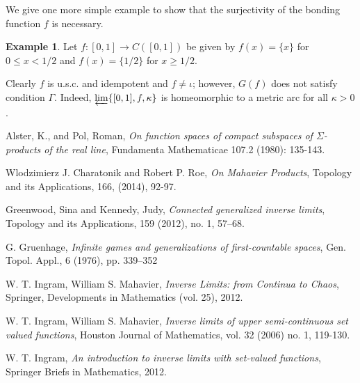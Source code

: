 \documentclass{amsart}
\theoremstyle{definition}
\newtheorem{example}[theorem]{Example}
\begin{document}
We give one more simple example to show that the surjectivity of the bonding function $f$ is necessary.

\begin{example} \label{ex2} Let $f: [0,1] \rightarrow C([0,1])$ be given by $f(x) = \{x\}$ for $0 \le x < 1/2$ and $f(x) = \{1/2\}$ for $x \ge 1/2$.
\end{example}

Clearly $f$ is u.s.c. and idempotent and $f \ne \iota$; however, $G(f)$ does not satisfy condition $\Gamma$. Indeed, $\varprojlim \{ [0,1], f, \kappa \}$ is homeomorphic to a metric arc for all $\kappa > 0$.


\begin{thebibliography}{10}

\smallskip

 Alster, K., and Pol, Roman, \textit{On function spaces of compact subspaces of $\Sigma$-products of the real line}, Fundamenta Mathematicae 107.2 (1980): 135-143.

\smallskip

 Wlodzimierz J. Charatonik and Robert P. Roe, {\it On Mahavier Products}, Topology and its Applications,
166, (2014), 92-97.

\smallskip

 Greenwood, Sina and Kennedy, Judy, {\it Connected generalized inverse limits}, Topology and its Applications,
159 (2012), no. 1, 57–68.

\smallskip

 G. Gruenhage, {\it Infinite games and generalizations of first-countable spaces}, Gen. Topol. Appl., 6 (1976), pp. 339–352

\smallskip

 W. T. Ingram, William S. Mahavier, {\it Inverse Limits: from Continua to Chaos}, Springer, Developments in Mathematics (vol. 25), 2012.

\smallskip

 W. T. Ingram, William S. Mahavier, {\it Inverse limits of upper semi-continuous set valued functions}, Houston Journal of Mathematics, vol. 32 (2006) no. 1, 119-130.

\smallskip

 W. T. Ingram, {\it An introduction to inverse limits with set-valued functions}, Springer Briefs in Mathematics, 2012.

\smallskip


\end{thebibliography}
\end{document}
